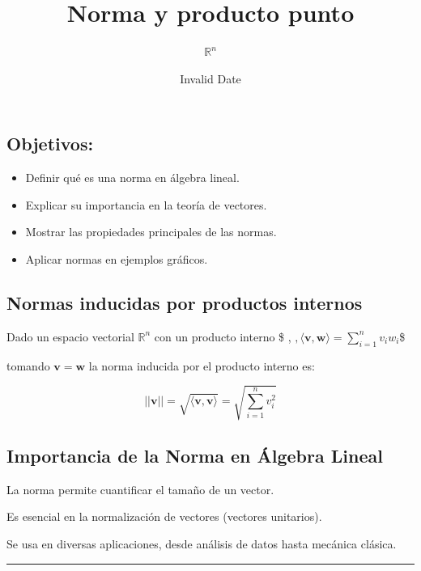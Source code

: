 \documentclass[
  letterpaper,
  DIV=11,
  numbers=noendperiod]{scrartcl}
\title{Norma y producto punto}
\subtitle{\(\mathbb{R}^n\)}
\author{}
\date{Invalid Date}
\begin{document}
\maketitle


\subsection{Objetivos:}\label{objetivos}

\begin{itemize}
\item
  Definir qué es una norma en álgebra lineal.
\item
  Explicar su importancia en la teoría de vectores.
\item
  Mostrar las propiedades principales de las normas.
\item
  Aplicar normas en ejemplos gráficos.
\end{itemize}

\subsection{Normas inducidas por productos
internos}\label{normas-inducidas-por-productos-internos}

Dado un espacio vectorial \(\mathbb{R}^n\) con un producto interno \$
\langle \cdot,
\cdot \rangle\(,\)\(\langle \mathbf{v}, \mathbf{w} \rangle = \sum_{i=1}^n v_i w_i\)\$

tomando \(\mathbf{v} = \mathbf{w}\) la norma inducida por el producto
interno es:

\[||\mathbf{v}|| = \sqrt{\langle \mathbf{v}, \mathbf{v} \rangle} = \sqrt{\sum_{i=1}^n v_i^2}\]

\subsection{Importancia de la Norma en Álgebra
Lineal}\label{importancia-de-la-norma-en-uxe1lgebra-lineal}

La norma permite cuantificar el tamaño de un vector.

Es esencial en la normalización de vectores (vectores unitarios).

Se usa en diversas aplicaciones, desde análisis de datos hasta mecánica
clásica.

\begin{center}\rule{0.5\linewidth}{0.5pt}\end{center}
\end{document}
